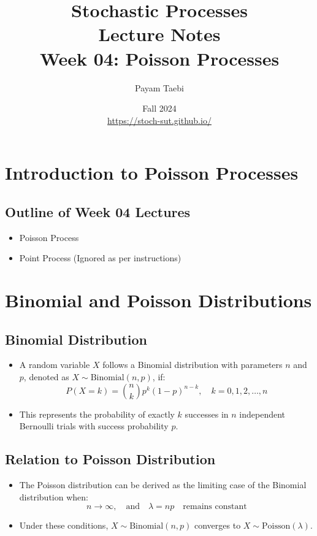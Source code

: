 \documentclass[12pt]{article}
\title{
    \vspace{-2cm}
    \LARGE{Stochastic Processes} \\
    \vspace{0.5cm}
    \Large{Lecture Notes} \\
    \vspace{0.5cm}
    \normalsize{Week 04: Poisson Processes}
}
\author{
    Payam Taebi \\
    \vspace{0.2cm}
    \normalsize{}
}
\date{
    Fall 2024 \\
    \vspace{0.2cm}
    \href{https://stoch-sut.github.io/}{https://stoch-sut.github.io/}
}
\begin{document}
\maketitle
\tableofcontents
\newpage

\section{Introduction to Poisson Processes}

\subsection{Outline of Week 04 Lectures}
\begin{itemize}
    \item Poisson Process
    \item Point Process (Ignored as per instructions)
\end{itemize}

\section{Binomial and Poisson Distributions}

\subsection{Binomial Distribution}
\begin{itemize}
    \item A random variable \( X \) follows a Binomial distribution with parameters \( n \) and \( p \), denoted as \( X \sim \text{Binomial}(n, p) \), if:
    \[
    P(X = k) = \binom{n}{k} p^k (1 - p)^{n - k}, \quad k = 0, 1, 2, \ldots, n
    \]
    \item This represents the probability of exactly \( k \) successes in \( n \) independent Bernoulli trials with success probability \( p \).
\end{itemize}

\subsection{Relation to Poisson Distribution}
\begin{itemize}
    \item The Poisson distribution can be derived as the limiting case of the Binomial distribution when:
    \[
    n \to \infty, \quad \text{and} \quad \lambda = n p \quad \text{remains constant}
    \]
    \item Under these conditions, \( X \sim \text{Binomial}(n, p) \) converges to \( X \sim \text{Poisson}(\lambda) \).
\end{itemize}
\end{document}
